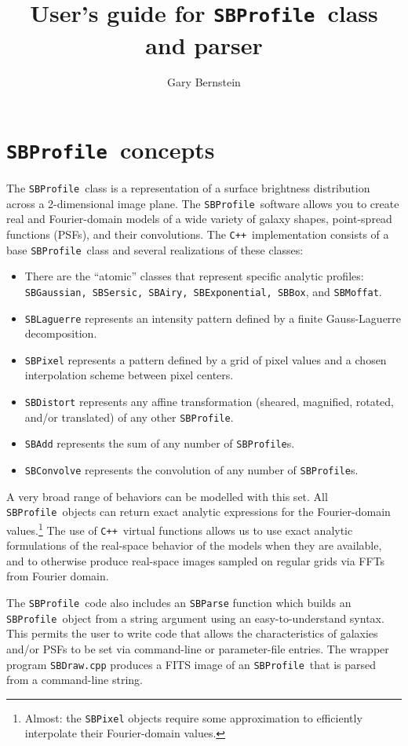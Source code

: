 \documentclass[11pt,preprint,flushrt]{aastex}
\begin{document}
\def\cpp{{\tt C++}}
\def\sbp{{\tt SBProfile}}
\def\sbph{{\tt SBProfile.h}}
\def\eqq#1{Equation~(\ref{#1})}

\title{User's guide for \sbp\ class and parser}
\author{Gary Bernstein}

\section{\sbp\ concepts}
The \sbp\ class is a representation of a surface brightness distribution across a 2-dimensional image plane.
The \sbp\ software allows you to create real and Fourier-domain models of a wide variety of galaxy shapes, point-spread functions (PSFs), and their convolutions.  The \cpp\ implementation consists of a base \sbp\ class and several realizations of these classes:
\begin{itemize}
\item There are the ``atomic'' classes that represent specific analytic profiles: {\tt SBGaussian, SBSersic, SBAiry, SBExponential, SBBox}, and {\tt SBMoffat}.
\item {\tt SBLaguerre} represents an intensity pattern defined by a finite Gauss-Laguerre decomposition.
\item {\tt SBPixel} represents a pattern defined by a grid of pixel values and a chosen interpolation scheme between pixel centers.
\item {\tt SBDistort} represents any affine transformation (sheared, magnified, rotated, and/or translated) of any other \sbp.
\item {\tt SBAdd} represents the sum of any number of {\sbp}s.
\item {\tt SBConvolve} represents the convolution of any number of {\sbp}s.
\end{itemize}
A very broad range of behaviors can be modelled with this set.  All \sbp\ objects can return exact analytic expressions for the Fourier-domain values.\footnote{Almost: the {\tt SBPixel} objects require some approximation to efficiently interpolate their Fourier-domain values.}  The use of \cpp\ virtual functions allows us to use exact analytic formulations of the real-space behavior of the models when they are available, and to otherwise produce real-space images sampled on regular grids via FFTs from Fourier domain.  

The \sbp\ code also includes an {\tt SBParse} function which builds an \sbp\ object from a string argument using an easy-to-understand syntax.  This permits the user to write code that allows the characteristics of galaxies and/or PSFs to be set via command-line or parameter-file entries.  The wrapper program {\tt SBDraw.cpp} produces a FITS image of an \sbp\ that is parsed from a command-line string.  
\end{document}
